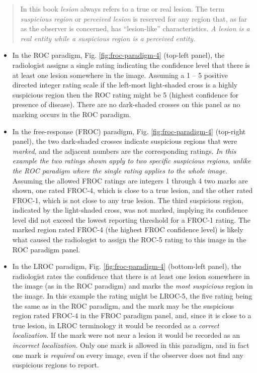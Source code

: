 \documentclass[
]{book}
\begin{document}
\begin{quote}
In this book \emph{lesion} always refers to a true or real lesion. The term \emph{suspicious region} or \emph{perceived lesion} is reserved for any region that, as far as the observer is concerned, has ``lesion-like'' characteristics. \emph{A lesion is a real entity while a suspicious region is a perceived entity.}
\end{quote}

\begin{itemize}
\item
  In the ROC paradigm, Fig. \ref{fig:froc-paradigm-4} (top-left panel), the radiologist assigns a single rating indicating the confidence level that there is at least one lesion somewhere in the image. Assuming a 1 -- 5 positive directed integer rating scale if the left-most light-shaded cross is a highly suspicious region then the ROC rating might be 5 (highest confidence for presence of disease). There are no dark-shaded crosses on this panel as no marking occurs in the ROC paradigm.
\item
  In the free-response (FROC) paradigm, Fig. \ref{fig:froc-paradigm-4} (top-right panel), the two dark-shaded crosses indicate suspicious regions that were \emph{marked}, and the adjacent numbers are the corresponding ratings. \emph{In this example the two ratings shown apply to two specific suspicious regions, unlike the ROC paradigm where the single rating applies to the whole image.} Assuming the allowed FROC ratings are integers 1 through 4 two marks are shown, one rated FROC-4, which is close to a true lesion, and the other rated FROC-1, which is not close to any true lesion. The third suspicious region, indicated by the light-shaded cross, was not marked, implying its confidence level did not exceed the lowest reporting threshold for a FROC-1 rating. The marked region rated FROC-4 (the highest FROC confidence level) is likely what caused the radiologist to assign the ROC-5 rating to this image in the ROC paradigm panel.
\item
  In the LROC paradigm, Fig. \ref{fig:froc-paradigm-4} (bottom-left panel), the radiologist rates the confidence that there is at least one lesion somewhere in the image (as in the ROC paradigm) and marks the \emph{most suspicious} region in the image. In this example the rating might be LROC-5, the five rating being the same as in the ROC paradigm, and the mark may be the suspicious region rated FROC-4 in the FROC paradigm panel, and, since it is close to a true lesion, in LROC terminology it would be recorded as a \emph{correct localization}. If the mark were not near a lesion it would be recorded as an \emph{incorrect localization}. Only one mark is allowed in this paradigm, and in fact one mark is \emph{required} on every image, even if the observer does not find any suspicious regions to report.

\end{itemize}
\end{document}

